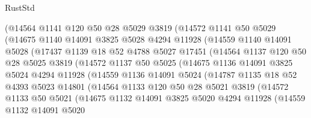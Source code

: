 \begin{lexlean}{RustStd}
\begin{coremodule}
            (@14564
              @1141
              @120
              @50
              @28
              @5029
              @3819
              (@14572
                @1141
                @50
                @5029
                (@14675
                  @1140
                  @14091
                  @3825
                  @5028
                  @4294
                  @11928
                  (@14559
                    @1140
                    @14091
                    @5028
                    (@17437
                      @1139
                      @18
                      @52
                      @4788
                      @5027
                      @17451
                      (@14564
                        @1137
                        @120
                        @50
                        @28
                        @5025
                        @3819
                        (@14572
                          @1137
                          @50
                          @5025
                          (@14675
                            @1136
                            @14091
                            @3825
                            @5024
                            @4294
                            @11928
                            (@14559
                              @1136
                              @14091
                              @5024
                              (@14787
                                @1135
                                @18
                                @52
                                @4393
                                @5023
                                @14801
                                (@14564
                                  @1133
                                  @120
                                  @50
                                  @28
                                  @5021
                                  @3819
                                  (@14572
                                    @1133
                                    @50
                                    @5021
                                    (@14675
                                      @1132
                                      @14091
                                      @3825
                                      @5020
                                      @4294
                                      @11928
                                      (@14559
                                        @1132
                                        @14091
                                        @5020

\end{coremodule}
\end{lexlean}
